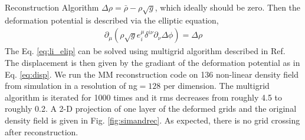 \begin{section}{Reconstruction Algorithm}
$\Delta \rho = \bar{\rho}-\rho \sqrt{g}$, which ideally should be zero. Then the 
deformation potential is described via the elliptic equation,
\begin{align}
 \label{eq:li_elip}
    \partial _\mu (\rho \sqrt{g} e^\mu _i \delta^{i\nu}\partial_\nu \Delta \phi)=\Delta \rho
\end{align}
The Eq. \ref{eq:li_elip} can be solved using multigrid algorithm described in Ref. 
\cite{bib:Pen1995,bib:Pen1998} The displacement is then given by the gradiant of the deformation 
potential as in Eq. \ref{eq:disp}. We run the MM reconstruction code on 136 non-linear density field from simulation 
in a resolution of ng$=128$ per dimension. The multigrid algorithm is iterated for 1000 times and it rms 
decreases from roughly 4.5 to roughly 0.2. 
A 2-D projection of one layer of the deformed grids and the 
original density field is given in Fig. \ref{fig:simandrec}. 
As expected, there is no grid crossing after reconstruction.
%
\end{section}

